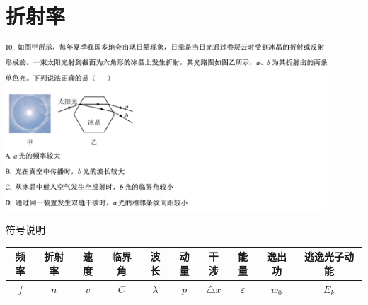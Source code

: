 \documentclass{article}
\begin{document}
\vspace{5em}

\section{折射率}
\includegraphics[width = 0.9\textwidth]{./pictures/24.png}

\vspace{5em}

符号说明

\begin{tabular}{|c|c|c|c|c|c|c|c|c|c|}
    \hline
    频率  & 折射率 & 速度  & 临界角 & 波长        & 动量  & 干涉            & 能量            & 逸出功     & 逃逸光子动能  \\
    \hline
    $f$ & $n$ & $v$ & $C$ & $\lambda$ & $p$ & $\triangle x$ & $\varepsilon$ & $w_{0}$ & $E_{k}$ \\
    \hline
\end{tabular}

\vspace*{2em}
\end{document}
